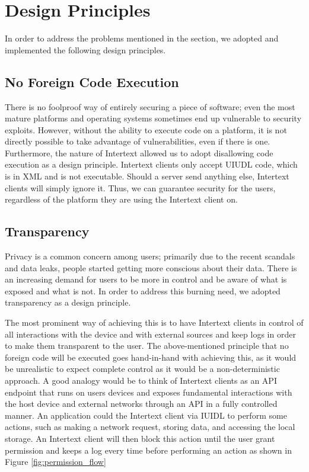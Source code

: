 \section{Design Principles} \label{designPrinciples}

In order to address the problems mentioned in the  section, we adopted and implemented the following design principles.

\subsection{No Foreign Code Execution}

There is no foolproof way of entirely securing a piece of software; even the most mature platforms and operating systems sometimes end up vulnerable to security exploits. However, without the ability to execute code on a platform, it is not directly possible to take advantage of vulnerabilities, even if there is one. Furthermore, the nature of Intertext allowed us to adopt disallowing code execution as a design principle. Intertext clients only accept UIUDL code, which is in XML and is not executable. Should a server send anything else, Intertext clients will simply ignore it. Thus, we can guarantee security for the users, regardless of the platform they are using the Intertext client on.

\subsection{Transparency}

Privacy is a common concern among users; primarily due to the recent scandals and data leaks, people started getting more conscious about their data. There is an increasing demand for users to be more in control and be aware of what is exposed and what is not. In order to address this burning need, we adopted transparency as a design principle. 

The most prominent way of achieving this is to have Intertext clients in control of all interactions with the device and with external sources and keep logs in order to make them transparent to the user. The above-mentioned principle that no foreign code will be executed goes hand-in-hand with achieving this, as it would be unrealistic to expect complete control as it would be a non-deterministic approach. A good analogy would be to think of Intertext clients as an API endpoint that runs on users devices and exposes fundamental interactions with the host device and external networks through an API in a fully controlled manner. An application could  the Intertext client via IUIDL to perform some actions, such as making a network request, storing data, and accessing the local storage. An Intertext client will then block this action until the user grant permission and keeps a log every time before performing an action as shown in Figure \ref{fig:permission_flow}

